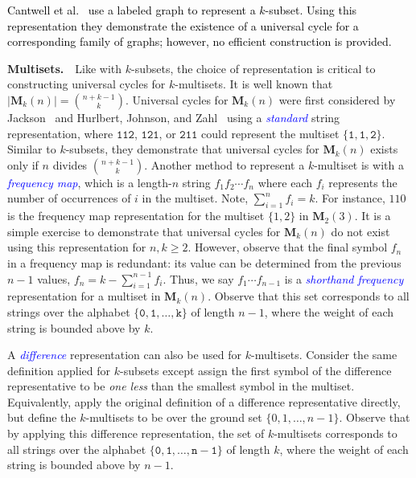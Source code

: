 \documentclass[US-letter,USenglish,authorcolumns,autoref]{lipics-v2021}
\renewcommand{\tt} {\mathtt}
\newcommand{\bM}{\mathbf{M}}
\newcommand{\defo}[1] {\emph{\textcolor{blue}{#1}}}
\newcommand{\edit}[1]{\textcolor{black}{#1}}
\begin{document}
\edit{Cantwell et al.~\cite{cantwell} use a labeled graph to represent a $k$-subset.  Using this representation they demonstrate the existence of a universal cycle for a corresponding family of graphs; however, no efficient construction is provided.}

\medskip

\noindent
{\bf Multisets.}~~Like with $k$-subsets, the choice of representation is critical to constructing universal cycles for $k$-multisets.  It is well known that $|\bM_k(n)| = {n + k -1 \choose k}$.  Universal cycles for $\bM_k(n)$ were first considered by Jackson~\cite{jackson} and Hurlbert, Johnson, and Zahl~\cite{hurlbert2009} using a \defo{standard} string representation, where $\tt{112}$, $\tt{121}$, or $\tt{211}$ could represent the multiset $\{\tt{1},\tt{1},\tt{2}\}$.    Similar to $k$-subsets, they  demonstrate that universal cycles for $\bM_k(n)$ exists only if $n$ divides ${n+k-1 \choose k}$.  Another method to represent a $k$-multiset is with a \defo{frequency map}, which is a length-$n$ string $f_1f_2\cdots f_n$ where each $f_i$ represents the number of occurrences of $i$ in the multiset. Note, $\sum_{i=1}^n f_i = k$.  
For instance, $110$ is the frequency map representation for the multiset $\{1,2\}$ in $\bM_2(3)$.  
It is a simple exercise to demonstrate that universal cycles for $\bM_k(n)$ do not exist using this representation for $n,k \geq 2$. %
%
However, observe that the final symbol $f_n$ in a frequency map is redundant: its value can be determined from the previous $n-1$ values,  $f_n = k -  \sum_{i=1}^{n-1} f_i$.  Thus, we say $f_1\cdots f_{n-1}$ is a \defo{shorthand frequency} representation for a multiset in $\bM_k(n)$.  
Observe that this set corresponds to all strings over the alphabet $\{\tt{0,1},\ldots, \tt{k}\}$ of length $n-1$,
where the weight of each string is bounded above by $k$.  

A \defo{difference} representation can also be used for $k$-multisets.  Consider the same definition applied for $k$-subsets except assign the first symbol of the difference representative to be \emph{one less} than the smallest symbol in the multiset.  Equivalently, apply the original definition of a difference representative directly, but define the $k$-multisets to be over the ground set $\{0,1, \ldots, n-1\}$.  Observe that by applying this difference representation,
the set of $k$-multisets corresponds to all strings  over the alphabet $\{\tt{0,1,\ldots, n{-}1}\}$ of length $k$, where the weight of each string is bounded above by $n-1$. 
\end{document}
